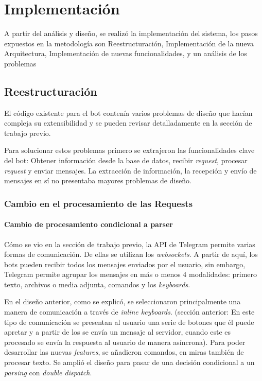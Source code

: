 \chapter{Implementación}\label{sec:imple}
    \par A partir del análisis y diseño, se realizó la implementación del sistema, los pasos expuestos en la metodología son Reestructuración, Implementación de la nueva Arquitectura, Implementación de nuevas funcionalidades, y un análisis de los problemas

\section{Reestructuración}\label{imp:refactoring}

    El código existente para el bot contenía varios problemas de diseño que hacían compleja su extensibilidad y se pueden revisar detalladamente en la sección de trabajo previo.

    \par Para solucionar estos problemas primero se extrajeron las funcionalidades clave del bot: Obtener información desde la base de datos, recibir \textit{request}, procesar \textit{request} y enviar mensajes. La extracción de información, la recepción y envío de mensajes en sí no presentaba mayores problemas de diseño. 

    \subsection{Cambio en el procesamiento de las Requests}

    \subsubsection{Cambio de procesamiento condicional a parser}
    
        \par Cómo se vio en la sección de trabajo previo, la API de \gls{Telegram} permite varias formas de comunicación. De ellas se utilizan los \textit{websockets}. A partir de aquí, los bots pueden recibir todos los mensajes enviados por el usuario, sin embargo, \gls{Telegram} permite agrupar los mensajes en más o menos 4 modalidades: primero texto, archivos o media adjunta, comandos y los \textit{keyboards}.

        \par En el diseño anterior, como se explicó, se seleccionaron principalmente una manera de comunicación  a través de \textit{inline keyboards}. (sección anterior: En este tipo de comunicación se presentan al usuario una serie de botones que él puede apretar y a partir de los se envía un mensaje al servidor, cuando este es procesado se envía la respuesta al usuario de manera asíncrona). Para poder desarrollar las nuevas \textit{features}, se añadieron comandos, en miras también de procesar texto. Se amplió el diseño para pasar de una decisión condicional a un  \textit{parsing} con \textit{double dispatch}.

